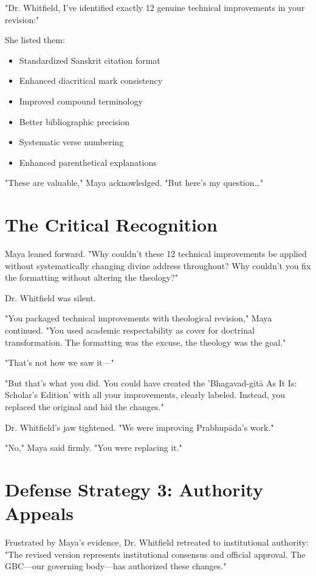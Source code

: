 \documentclass[11pt,twoside]{book}
\begin{document}
"Dr. Whitfield, I've identified exactly 12 genuine technical improvements in your revision:"

She listed them:
\begin{itemize}
\item Standardized Sanskrit citation format
\item Enhanced diacritical mark consistency
\item Improved compound terminology
\item Better bibliographic precision
\item Systematic verse numbering
\item Enhanced parenthetical explanations
\end{itemize}

"These are valuable," Maya acknowledged. "But here's my question\ldots{}"
\section*{The Critical Recognition}
\label{sec:org50494ad}

Maya leaned forward. "Why couldn't these 12 technical improvements be applied without systematically changing divine address throughout? Why couldn't you fix the formatting without altering the theology?"

Dr. Whitfield was silent.

"You packaged technical improvements with theological revision," Maya continued. "You used academic respectability as cover for doctrinal transformation. The formatting was the excuse, the theology was the goal."

"That's not how we saw it—"

"But that's what you did. You could have created the 'Bhagavad-gītā As It Is: Scholar's Edition' with all your improvements, clearly labeled. Instead, you replaced the original and hid the changes."

Dr. Whitfield's jaw tightened. "We were improving Prabhupāda's work."

"No," Maya said firmly. "You were replacing it."
\section*{Defense Strategy 3: Authority Appeals}
\label{sec:orge5902fe}

Frustrated by Maya's evidence, Dr. Whitfield retreated to institutional authority: "The revised version represents institutional consensus and official approval. The GBC—our governing body—has authorized these changes."
\end{document}
